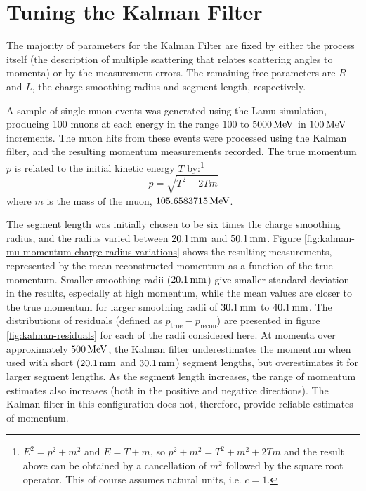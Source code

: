 \section{Tuning the Kalman Filter}\label{sec:kalman-tuning}
The majority of parameters for the Kalman Filter are fixed by either the process itself (the description of multiple scattering that relates scattering angles to momenta) or by the measurement errors. The remaining free parameters are $R$ and $L$, the charge smoothing radius and segment length, respectively.

A sample of single muon events was generated using the Lamu simulation, producing 100 muons at each energy in the range $100$ to $5000\,\mathrm{MeV}$ in $100\,\mathrm{MeV}$ increments. The muon hits from these events were processed using the Kalman filter, and the resulting momentum measurements recorded. The true momentum $p$ is related to the initial kinetic energy $T$ by:\footnote{$E^2 = p^2+m^2$ and $E = T + m$, so $p^2 + m^2 = T^2 + m^2 + 2 T m$ and the result above can be obtained by a cancellation of $m^2$ followed by the square root operator. This of course assumes natural units, i.e. $c=1$.}
\begin{equation}\label{eqn:momentum-kinetic-energy-relationship}
p = \sqrt{T^2 + 2 T m}
\end{equation}
where $m$ is the mass of the muon, $105.6583715\,\mathrm{MeV}$\citep{PDG2011}.

The segment length was initially chosen to be six times the charge smoothing radius, and the radius varied between $20.1\,\mathrm{mm}$ and $50.1\,\mathrm{mm}$. Figure \ref{fig:kalman-mu-momentum-charge-radius-variations} shows the resulting measurements, represented by the mean reconstructed momentum as a function of the true momentum. Smaller smoothing radii ($20.1\,\mathrm{mm}$) give smaller standard deviation in the results, especially at high momentum, while the mean values are closer to the true momentum for larger smoothing radii of $30.1\,\mathrm{mm}$ to $40.1\,\mathrm{mm}$. The distributions of residuals (defined as $p_{\mathrm{true}} - p_{\mathrm{recon}}$) are presented in figure \ref{fig:kalman-residuals} for each of the radii considered here. At momenta over approximately $500\,\mathrm{MeV}$, the Kalman filter underestimates the momentum when used with short ($20.1\,\mathrm{mm}$ and $30.1\,\mathrm{mm}$) segment lengths, but overestimates it for larger segment lengths. As the segment length increases, the range of momentum estimates also increases (both in the positive and negative directions). The Kalman filter in this configuration does not, therefore, provide reliable estimates of momentum.

